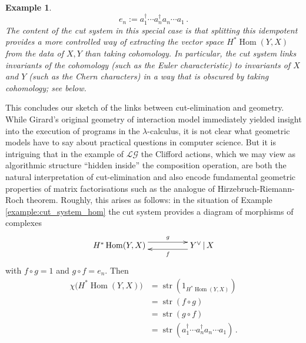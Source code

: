 \documentclass[english,letter paper,12pt,reqno]{article}
\theoremstyle{example}
\newtheorem{example}[theorem]{Example}
\numberwithin{equation}{section}
\def\LG{\mathcal{LG}}
\def\Hom{\operatorname{Hom}}
\DeclareMathOperator{\str}{str}
\begin{document}
\begin{example}
\[
e_n := a_1^\dagger \cdots a_n^\dagger a_n \cdots a_1\,.
\]
The content of the cut system in this special case is that splitting this idempotent provides a more controlled way of extracting the vector space $H^* \Hom(Y,X)$ from the data of $X,Y$ than taking cohomology. In particular, the cut system links invariants of the cohomology (such as the Euler characteristic) to invariants of $X$ and $Y$ (such as the Chern characters) in a way that is obscured by taking cohomology; see below.
\end{example}

This concludes our sketch of the links between cut-elimination and geometry. While Girard's original geometry of interaction model immediately yielded insight into the execution of programs in the $\lambda$-calculus, it is not clear what geometric models have to say about practical questions in computer science. But it is intriguing that in the example of $\LG$ the Clifford actions, which we may view as algorithmic structure ``hidden inside'' the composition operation, are both the natural interpretation of cut-elimination and also encode fundamental geometric properties of matrix factorisations such as the analogue of Hirzebruch-Riemann-Roch theorem. Roughly, this arises as follows: in the situation of Example \ref{example:cut_system_hom} the cut system provides a diagram of morphisms of complexes
\[
\xymatrix@C+2pc{
H^* \Hom(Y,X) \ar@<1ex>[r]^-{g} & Y^{\vee} \l X \ar@<1ex>[l]^-{f}
}
\]
with $f \circ g = 1$ and $g \circ f  = e_n$. Then
\begin{align*}
\chi\big( H^* \Hom(Y,X) \big) &= \str( 1_{H^*\Hom(Y,X)} )\\
&= \str( f \circ g )\\
&= \str( g \circ f )\\
&= \str( a_1^\dagger \cdots a_n^\dagger a_n \cdots a_1 )\,.
\end{align*}
\end{document}
